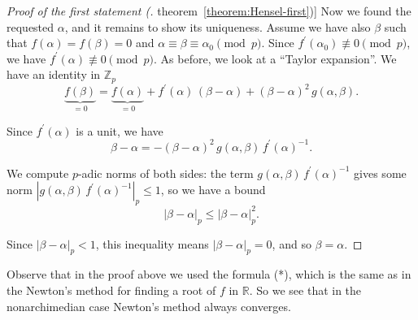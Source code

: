 \documentclass{article}
\newcommand{\ZZ}{\mathbb{Z}}
\newcommand{\refref}[2]{\hyperref[#2]{#1~\ref*{#2}}}
\theoremstyle{myplain}
\theoremstyle{mydefinition}
\begin{document}
\begin{proof}[Proof of the first statement (\refref{theorem}{theorem:Hensel-first})]
  Now we found the requested $\alpha$, and it remains to show its
  uniqueness. Assume we have also $\beta$ such that $f (\alpha) = f (\beta) = 0$
  and $\alpha \equiv \beta \equiv \alpha_0 \pmod{p}$. Since
  $f^\prime (\alpha_0) \not\equiv 0 \pmod{p}$, we have
  $f^\prime (\alpha) \not\equiv 0 \pmod{p}$. As before, we look at a ``Taylor
  expansion''. We have an identity in $\ZZ_p$
  $$\underbrace{f (\beta)}_{= 0} = \underbrace{f (\alpha)}_{= 0} + f^\prime (\alpha) \, (\beta-\alpha) + (\beta - \alpha)^2 \, g (\alpha,\beta).$$

  Since $f^\prime (\alpha)$ is a unit, we have
  $$\beta - \alpha = -(\beta-\alpha)^2 \, g(\alpha,\beta) \, f^\prime (\alpha)^{-1}.$$

  We compute $p$-adic norms of both sides: the term
  $g(\alpha,\beta) \, f^\prime (\alpha)^{-1}$ gives some norm
  $|g(\alpha,\beta) \, f^\prime (\alpha)^{-1}|_p \le 1$, so we have a bound
  $$|\beta-\alpha|_p \le |\beta - \alpha|_p^2.$$

  Since $|\beta-\alpha|_p < 1$, this inequality means
  $|\beta-\alpha|_p = 0$, and so $\beta = \alpha$.
\end{proof}

Observe that in the proof above we used the formula (*), which is the same as in
the Newton's method for finding a root of $f$ in $\mathbb{R}$. So we see that in
the nonarchimedian case Newton's method always converges.

\vspace{1em}
\end{document}
